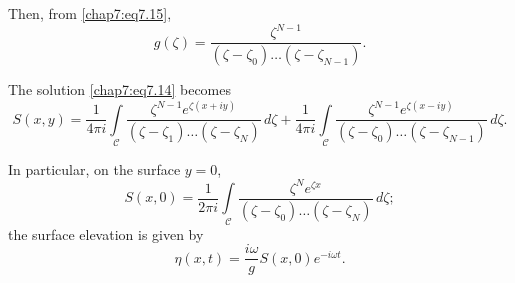 Then, from \eqref{chap7:eq7.15},
\begin{equation}
g(\zeta)=\frac{\zeta^{N-1}}{\left(\zeta-\zeta_0\right)\ldots\left(\zeta- \zeta_{N-1}\right)}.\tag{7.27}\label{chap7:eq7.27}
\end{equation}

The solution \eqref{chap7:eq7.14} becomes 
{\fontsize{10}{12}\selectfont
\begin{equation}
S(x,y)=\frac{1}{4\pi i}\int\limits_{\mathscr{C}}\frac{\zeta^{N-1}e^{\zeta(x+iy)}} {\left(\zeta-\zeta_1\right)\ldots\left(\zeta-\zeta_N\right)}\,d\zeta+ \frac{1} {4\pi i}\int\limits_{\mathscr{C}}\frac{\zeta^{N-1}e^{\zeta(x-iy)}}{\left(\zeta- \zeta_0 \right)\ldots\left(\zeta-\zeta_{N-1}\right)}\,d\zeta. \tag{7.28}\label{chap7:eq7.28}
\end{equation}}

In particular, on the surface $y=0$, 
\begin{equation}
S(x,0)=\frac{1}{2\pi i}\int\limits_{\mathscr{C}}\frac{\zeta^Ne^{\zeta x}}{\left(\zeta- \zeta_0\right)\ldots\left(\zeta-\zeta_N\right)}\,d\zeta; \tag{7.29}\label{chap7:eq7.29}
\end{equation}
the surface elevation is given by 
\begin{equation}
\eta(x,t)=\frac{i\omega}{g}S(x,0)e^{-i\omega t}.\tag{7.30}\label{chap7:eq7.30}
\end{equation}

\medskip
{}\pageoriginale

